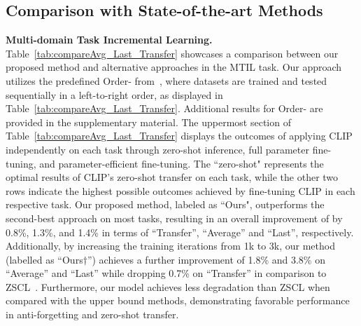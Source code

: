 \subsection{Comparison with State-of-the-art Methods}
\label{comparison}
\textbf{Multi-domain Task Incremental Learning.} 
Table~\ref{tab:compareAvg_Last_Transfer} showcases a comparison between our proposed method and alternative approaches in the MTIL task. Our approach utilizes the predefined Order-\uppercase\expandafter{} from~\cite{zheng2023preventing}, where datasets are trained and tested sequentially in a left-to-right order, as displayed in Table~\ref{tab:compareAvg_Last_Transfer}. Additional results for Order-\uppercase\expandafter{} are provided in the supplementary material. 
%
The uppermost section of Table~\ref{tab:compareAvg_Last_Transfer} displays the outcomes of applying CLIP independently on each task through zero-shot inference, full parameter fine-tuning, and parameter-efficient fine-tuning. The ``zero-shot" represents the optimal results of CLIP's zero-shot transfer on each task, while the other two rows indicate the highest possible outcomes achieved by fine-tuning CLIP in each respective task.
%
Our proposed method, labeled as ``Ours", outperforms the second-best approach on most tasks, resulting in an overall improvement of by 0.8\%, 1.3\%, and 1.4\% in terms of ``Transfer'', ``Average'' and ``Last'', respectively. Additionally, by increasing the training iterations from 1k to 3k, our method (labelled as ``Ours$\dagger$'') achieves a further improvement of 1.8\% and 3.8\% on ``Average'' and ``Last'' while dropping 0.7\% on ``Transfer'' in comparison to ZSCL~\cite{zheng2023preventing}. Furthermore, our model achieves less degradation than ZSCL when compared with the upper bound methods, demonstrating favorable performance in anti-forgetting and zero-shot transfer.  


